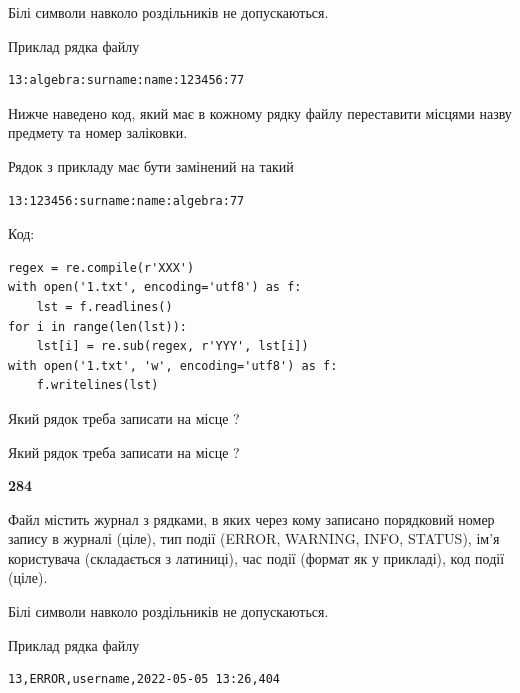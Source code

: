 Білі символи навколо роздільників не допускаються.

Приклад рядка файлу



\begin{verbatim}
13:algebra:surname:name:123456:77
\end{verbatim}


Нижче наведено код, який має в кожному рядку файлу переставити місцями назву предмету та номер заліковки.

Рядок з прикладу має бути замінений на такий



\begin{verbatim}
13:123456:surname:name:algebra:77
\end{verbatim}




Код:



\begin{verbatim}
regex = re.compile(r'XXX')
with open('1.txt', encoding='utf8') as f:
    lst = f.readlines()
for i in range(len(lst)):
    lst[i] = re.sub(regex, r'YYY', lst[i])
with open('1.txt', 'w', encoding='utf8') as f:
    f.writelines(lst)
\end{verbatim}







Який рядок треба записати на місце  ?\par
\vspace{5mm}


Який рядок треба записати на місце  ?\par


\newpage

{\begin {center}\textbf{ 284}\end {center}}\par
Файл  містить журнал з рядками, в яких через кому записано поряд\-ко\-вий номер запису в журналі (ціле), тип події (ERROR, WARNING, INFO, STATUS), ім'я користувача (складається з латиниці), час події (фор\-мат як у прикладі), код події (ціле).

Білі символи навколо роздільників не допускаються.

Приклад рядка файлу



\begin{verbatim}
13,ERROR,username,2022-05-05 13:26,404
\end{verbatim}


